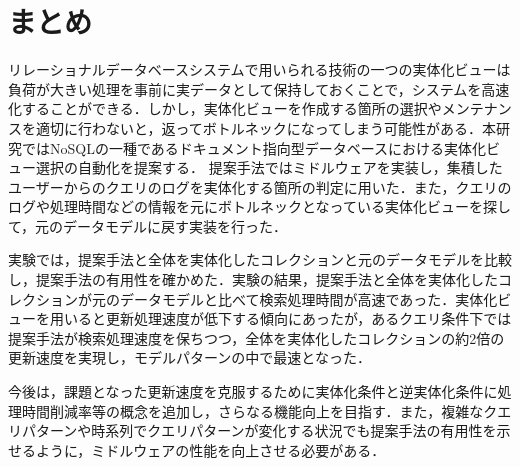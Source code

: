 \documentclass[a4paper,11pt]{ujreport}
\begin{document}
\chapter{まとめ}
\label{chap:Conclusion}
リレーショナルデータベースシステムで用いられる技術の一つの実体化ビューは負荷が大きい処理を事前に実データとして保持しておくことで，システムを高速化することができる．しかし，実体化ビューを作成する箇所の選択やメンテナンスを適切に行わないと，返ってボトルネックになってしまう可能性がある．本研究ではNoSQLの一種であるドキュメント指向型データベースにおける実体化ビュー選択の自動化を提案する．
提案手法ではミドルウェアを実装し，集積したユーザーからのクエリのログを実体化する箇所の判定に用いた．また，クエリのログや処理時間などの情報を元にボトルネックとなっている実体化ビューを探して，元のデータモデルに戻す実装を行った．

実験では，提案手法と全体を実体化したコレクションと元のデータモデルを比較し，提案手法の有用性を確かめた．実験の結果，提案手法と全体を実体化したコレクションが元のデータモデルと比べて検索処理時間が高速であった．実体化ビューを用いると更新処理速度が低下する傾向にあったが，あるクエリ条件下では提案手法が検索処理速度を保ちつつ，全体を実体化したコレクションの約2倍の更新速度を実現し，モデルパターンの中で最速となった．

今後は，課題となった更新速度を克服するために実体化条件と逆実体化条件に処理時間削減率等の概念を追加し，さらなる機能向上を目指す．また，複雑なクエリパターンや時系列でクエリパターンが変化する状況でも提案手法の有用性を示せるように，ミドルウェアの性能を向上させる必要がある．
\end{document}
